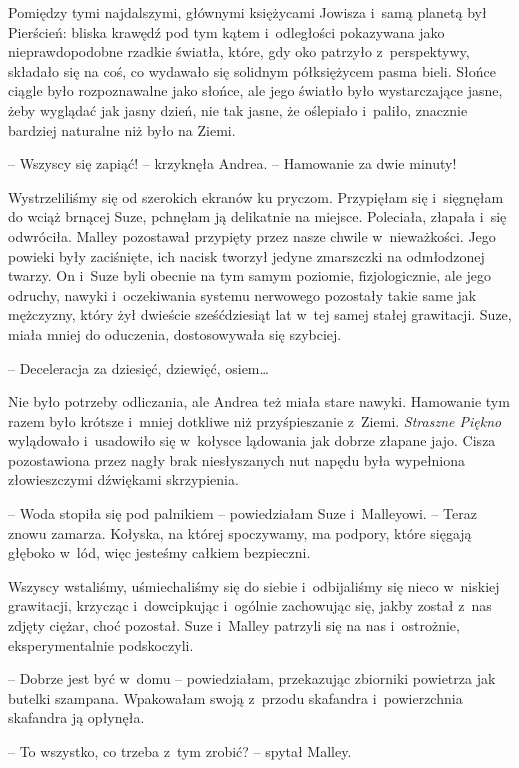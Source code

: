 \documentclass[oneside,polish,11pt,sfheadings]{mwbk}
\begin{document}
Pomiędzy tymi najdalszymi, głównymi księżycami Jowisza i~samą planetą
był Pierścień: bliska krawędź pod tym kątem i~odległości pokazywana jako
nieprawdopodobne rzadkie światła, które, gdy oko patrzyło z~perspektywy,
składało się na coś, co wydawało się solidnym półksiężycem pasma bieli.
Słońce ciągle było rozpoznawalne jako słońce, ale jego światło było
wystarczające jasne, żeby wyglądać jak jasny dzień, nie tak jasne, że
oślepiało i~paliło, znacznie bardziej naturalne niż było na Ziemi.

-- Wszyscy się zapiąć! -- krzyknęła Andrea. -- Hamowanie za dwie minuty!

Wystrzeliliśmy się od szerokich ekranów ku pryczom. Przypięłam się i~sięgnęłam do wciąż brnącej Suze, pchnęłam ją delikatnie na miejsce.
Poleciała, złapała i~się odwróciła. Malley pozostawał przypięty przez
nasze chwile w~nieważkości. Jego powieki były zaciśnięte, ich nacisk
tworzył jedyne zmarszczki na odmłodzonej twarzy. On i~Suze byli obecnie
na tym samym poziomie, fizjologicznie, ale jego odruchy, nawyki i~oczekiwania systemu nerwowego pozostały takie same jak mężczyzny, który
żył dwieście sześćdziesiąt lat w~tej samej stałej grawitacji. Suze,
miała mniej do oduczenia, dostosowywała się szybciej.

-- Deceleracja za dziesięć, dziewięć, osiem\ldots 

Nie było potrzeby odliczania, ale Andrea też miała stare nawyki.
Hamowanie tym razem było krótsze i~mniej dotkliwe niż przyśpieszanie z~Ziemi. \textit{Straszne Piękno} wylądowało i~usadowiło się w~kołysce
lądowania jak dobrze złapane jajo. Cisza pozostawiona przez nagły brak
niesłyszanych nut napędu była wypełniona złowieszczymi dźwiękami
skrzypienia.

-- Woda stopiła się pod palnikiem -- powiedziałam Suze i~Malleyowi. -- Teraz znowu zamarza. Kołyska, na której spoczywamy, ma podpory, które
sięgają głęboko w~lód, więc jesteśmy całkiem bezpieczni.

Wszyscy wstaliśmy, uśmiechaliśmy się do siebie i~odbijaliśmy się nieco w~niskiej grawitacji, krzycząc i~dowcipkując i~ogólnie zachowując się,
jakby został z~nas zdjęty ciężar, choć pozostał. Suze i~Malley patrzyli
się na nas i~ostrożnie, eksperymentalnie podskoczyli.

-- Dobrze jest być w~domu -- powiedziałam, przekazując zbiorniki powietrza
jak butelki szampana. Wpakowałam swoją z~przodu skafandra i~powierzchnia
skafandra ją opłynęła.

-- To wszystko, co trzeba z~tym zrobić? -- spytał Malley.
\end{document}
